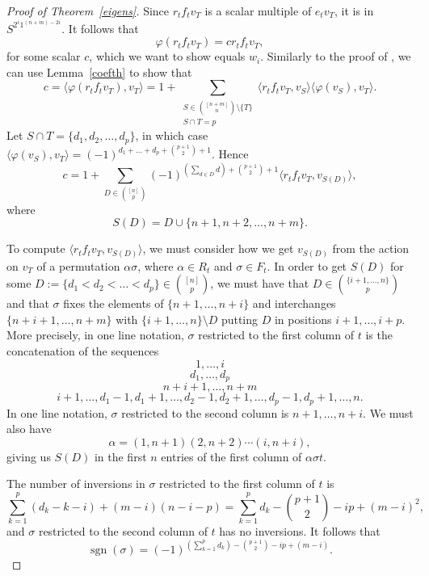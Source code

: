 \documentclass[12pt]{amsart}
\numberwithin{equation}{section}
\DeclareMathOperator{\sgn}{sgn}
\newcommand{\be}{\begin{equation}}
\newcommand{\ee}{\end{equation}}
\begin{document}
\begin{proof}[Proof of Theorem~\ref{eigens}]
Since $r_t f_t v_T$ is a scalar multiple of $e_tv_T$, it is in $S^ {2^i1^{(n+m)-2i}}$.  It follows that 
$$\varphi(r_t f_t v_T ) = c r_t f_t v_T ,$$ for some scalar $c$, which we want to show equals $w_i$.
 Similarly to the proof of \cite[Theorem 2.4]{FHSW2}, we can  use Lemma~\ref{coefth} to show that 
$$c=\langle \varphi(r_t f_t v_T), v_T \rangle = 1+  \sum_{\substack{S \in \binom{[n+m]}{n} \setminus \{T\}\\ S\cap T =p}} \langle r_t f_t v_T , v_S\rangle \langle\varphi(v_S),v_T\rangle.$$
Let $S \cap T=  \{d_1,d_2,\dots,d_{p}\}$,  in which case $ \langle\varphi(v_S),v_T\rangle = (-1)^{d_1+ \dots + d_{p} +\binom {p+1}2+1}$.  Hence 
\be \label{dsumeq} c = 1+ \sum_{D \in \binom{[n]}{ p} }(-1)^{\left (\sum_{d \in D} d \right ) +\binom{p+1}2+1} \langle r_t f_t v_T , v_{S(D)}\rangle,\ee
where  $$S(D) = D \cup \{n+1,n+2,\dots,n+m\}.$$

To compute $ \langle r_t f_t v_T , v_{S(D)}\rangle$, we must consider how we get $v_{S(D)}$ from the action on $v_T$ of a permutation  $\alpha \sigma$, where $\alpha \in R_t$ and $\sigma \in F_t$.
In order to get $S(D)$ for some $D:=\{d_1<d_2<\dots<d_p\}  \in \binom{[n]}{ p} $, we must have that $D \in \binom{\{i+1,\dots,n\}} p$ and that $\sigma$ fixes the elements of $\{n+1,\dots, n+i\}$ and  interchanges 
$\{n+i+1, \ldots , n+m\}$ with $\{i+1,\dots,n\} \setminus D$ putting $D$ in positions $i+1,\dots,i+p$. More precisely, in one line notation, $\sigma$ restricted to the first column of $t$ is the concatenation of  the sequences $$ 1,\dots, i $$ $$ d_1,\dots,d_p$$ 
$$ n+i+1,\dots, n+m$$
$$i+1, \ldots , d_1-1, d_1+1, \ldots, d_2-1,d_2+1, \ldots, d_p-1, d_p+1, \ldots, n.$$
In one line notation, $\sigma$ restricted to the second column is  $n+1, \dots, n+i $.
 We must also have
$$\alpha = (1, n+1)(2, n+2)\cdots (i, n+i),$$
giving us $S(D)$ in the first $n$ entries of the first column of $\alpha\sigma t$.  


The number of inversions in $\sigma$ restricted to the first column of $t$ is $$\sum_{k=1}^p (d_k-k -i )+ (m-i)(n-i-p) = \sum_{k=1}^p d_k -\binom {p+1}2 -ip+ (m-i)^2,
$$  and $\sigma$ restricted to the second column of $t$ has no inversions.
It follows that 
\be \label{sgneq} \sgn(\sigma) = (-1)^{\left (\sum_{k=1}^p d_k \right)-\binom {p+1}2 -ip + (m-i)}.\ee


\end{proof}
\end{document}
